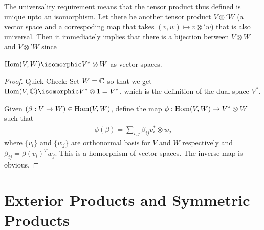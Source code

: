 \begin{center}
\end{center}
The universality requirement means that the tensor product thus defined is unique upto an isomorphism. Let there be another tensor product $V\otimes' W$ (a vector space and a correspoding map that takes $(v,w)\mapsto v\otimes' w$) that is also universal. Then it immediately implies that there is a bijection between $V\otimes W$ and $V\otimes' W$ since
\begin{center}
\end{center}

\begin{theorem}[]
    $\Hom(V,W) \isomorphic V^*\otimes W$ as vector spaces.
\end{theorem}
\begin{proof}
   Quick Check: Set $W=\mathbb{C}$ so that we get $\Hom(V,\CC)\isomorphic V^*\otimes 1 = V^*$, which is the definition of the dual space $V^*$.

   Given $(\beta: V\to W) \in \operatorname{Hom}(V,W)$, define the map $\phi: \operatorname{Hom}(V,W)\to V^* \otimes W $ such that 
   \begin{align}
       \phi(\beta) = \sum_{i,j} \beta_{ij} v_i^* \otimes w_j
   \end{align}
   where $\{v_i\}$ and $\{w_j\}$ are orthonormal basis for $V$ and $W$ respectively and $\beta_{ij} = \beta(v_i)^T w_j$.
   This is a homorphism of vector spaces. The inverse map is obvious.
\end{proof}

\section{Exterior Products and Symmetric Products}
\label{sec:exterior_products_and_symmetric_products}

